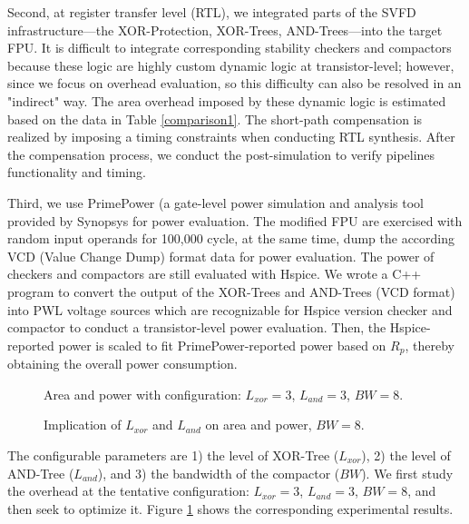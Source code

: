 Second, at register transfer level (RTL), we integrated parts of the SVFD infrastructure---the XOR-Protection, XOR-Trees, AND-Trees---into the target FPU. It is difficult to integrate corresponding stability checkers and compactors because these logic are highly custom dynamic logic at transistor-level; however, since we focus on overhead evaluation, so this difficulty can also be resolved in an "indirect" way. The area overhead imposed by these dynamic logic is estimated based on the data in Table \ref{comparison1}. The short-path compensation is realized by imposing a timing constraints when conducting RTL synthesis. After the compensation process, we conduct the post-simulation to verify pipelines functionality and timing.

Third, we use PrimePower (a gate-level power simulation and analysis tool provided by Synopsys for power evaluation. The modified FPU are exercised with random input operands for 100,000 cycle, at the same time, dump the according VCD (Value Change Dump) format data for power evaluation. The power of checkers and compactors are still evaluated with Hspice. We wrote a C++ program to convert the output of the XOR-Trees and AND-Trees (VCD format) into PWL voltage sources which are recognizable for Hspice version checker and compactor to conduct a transistor-level power evaluation. Then, the Hspice-reported power is scaled to fit PrimePower-reported power based on $R_p$, thereby obtaining the overall power consumption.

\begin{figure}
\centering 
{} 
\caption{Area and power with configuration: $L_{xor}=3$, $L_{and}=3$, $BW=8$.} \label{area_power}
\end{figure}

\begin{figure}
\centering {}   \caption{Implication of
$L_{xor}$ and $L_{and}$ on area and power, $BW=8$.} \label{lxor_land}
\end{figure}

\vspace{0.3cm}
The configurable parameters are 1) the level of XOR-Tree ($L_{xor}$), 2) the level of AND-Tree ($L_{and}$), and 3) the bandwidth of the compactor ($BW$). We first study the overhead at the tentative configuration: $L_{xor}=3$, $L_{and}=3$, $BW=8$, and then seek to optimize it. Figure \ref{area_power} shows the corresponding experimental results.

